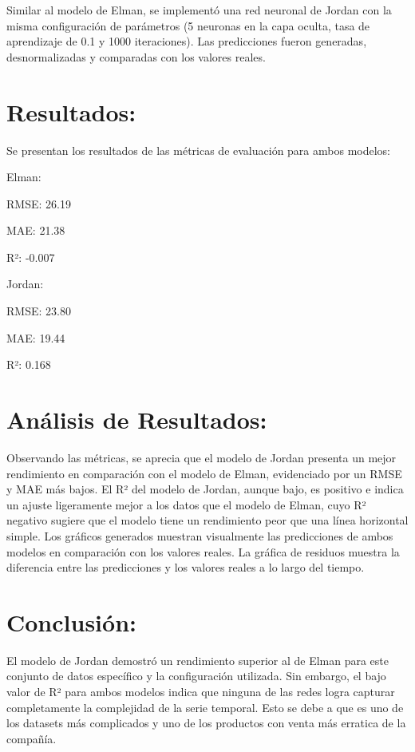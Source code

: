 \documentclass[
]{book}
\begin{document}
Similar al modelo de Elman, se implementó una red neuronal de Jordan con la misma configuración de parámetros (5 neuronas en la capa oculta, tasa de aprendizaje de 0.1 y 1000 iteraciones). Las predicciones fueron generadas, desnormalizadas y comparadas con los valores reales.

\section{Resultados:}\label{resultados-1}

Se presentan los resultados de las métricas de evaluación para ambos modelos:

Elman:

RMSE: 26.19

MAE: 21.38

R²: -0.007

Jordan:

RMSE: 23.80

MAE: 19.44

R²: 0.168

\section{Análisis de Resultados:}\label{anuxe1lisis-de-resultados}

Observando las métricas, se aprecia que el modelo de Jordan presenta un mejor rendimiento en comparación con el modelo de Elman, evidenciado por un RMSE y MAE más bajos. El R² del modelo de Jordan, aunque bajo, es positivo e indica un ajuste ligeramente mejor a los datos que el modelo de Elman, cuyo R² negativo sugiere que el modelo tiene un rendimiento peor que una línea horizontal simple. Los gráficos generados muestran visualmente las predicciones de ambos modelos en comparación con los valores reales. La gráfica de residuos muestra la diferencia entre las predicciones y los valores reales a lo largo del tiempo.

\section{Conclusión:}\label{conclusiuxf3n-2}

El modelo de Jordan demostró un rendimiento superior al de Elman para este conjunto de datos específico y la configuración utilizada. Sin embargo, el bajo valor de R² para ambos modelos indica que ninguna de las redes logra capturar completamente la complejidad de la serie temporal. Esto se debe a que es uno de los datasets más complicados y uno de los productos con venta más erratica de la compañía.
\end{document}

